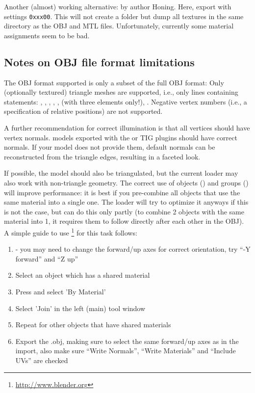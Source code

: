 Another (almost) working alternative:  by author
Honing.  Here, export with settings \texttt{0xxx00}. This will not create a
 folder but dump all textures in the same directory as the OBJ
and MTL files. Unfortunately, currently some material assignments seem to be
bad.


\subsection{Notes on OBJ file format limitations}
\label{sec:scenery3d:OBJlimitations}

The OBJ format supported is only a subset of the full OBJ format: Only
(optionally textured) triangle meshes are supported, i.e., only lines containing
statements: , , , , , 
(with three elements only!), . Negative vertex numbers (i.e., a
specification of relative positions) are not supported.

A further recommendation for correct illumination is that all vertices should
have vertex normals.  models exported with the  or TIG plugins
should have correct normals. If your model does not provide them, default
normals can be reconstructed from the triangle edges, resulting in a faceted
look.

If possible, the model should also be triangulated, but the current loader may
also work with non-triangle geometry. 
The correct use of objects () and groups ()
will improve performance: it is best if you pre-combine all objects
that use the same material into a single one. The loader will try to
optimize it anyways if this is not the case, but can do this only
partly (to combine 2 objects with the same material into 1, it
requires them to follow directly after each other in the OBJ). A
simple guide to use
\footnote{\url{http://www.blender.org}} for this task
follows:

\begin{enumerate}
\item {} - you may need to change the forward/up axes for correct orientation, try ``-Y forward'' and ``Z up''
\item Select an object which has a shared material
\item Press  and select 'By Material'
\item Select 'Join' in the left (main) tool window
\item Repeat for other objects that have shared materials
\item Export the .obj, making sure to select the same forward/up axes as in the import, also make sure ``Write Normals'', ``Write Materials'' and ``Include UVs'' are checked
\end{enumerate}

